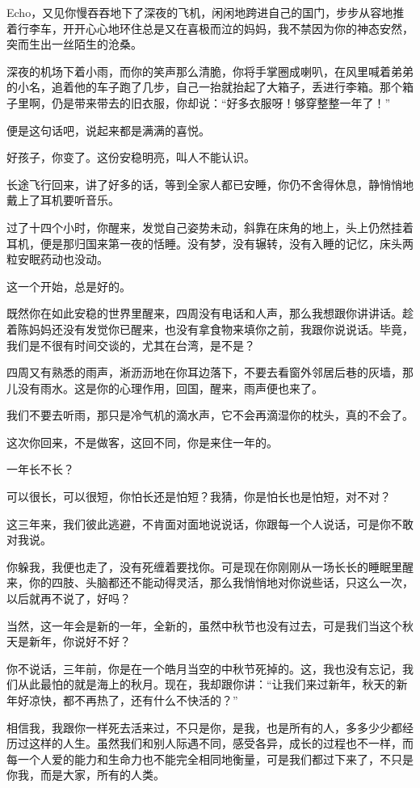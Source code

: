 \par Echo，又见你慢吞吞地下了深夜的飞机，闲闲地跨进自己的国门，步步从容地推着行李车，开开心心地环住总是又在喜极而泣的妈妈，我不禁因为你的神态安然，突而生出一丝陌生的沧桑。
\par 深夜的机场下着小雨，而你的笑声那么清脆，你将手掌圈成喇叭，在风里喊着弟弟的小名，追着他的车子跑了几步，自己一抬就抬起了大箱子，丢进行李箱。那个箱子里啊，仍是带来带去的旧衣服，你却说：“好多衣服呀！够穿整整一年了！”
\par 便是这句话吧，说起来都是满满的喜悦。
\par 好孩子，你变了。这份安稳明亮，叫人不能认识。
\par 长途飞行回来，讲了好多的话，等到全家人都已安睡，你仍不舍得休息，静悄悄地戴上了耳机要听音乐。
\par 过了十四个小时，你醒来，发觉自己姿势未动，斜靠在床角的地上，头上仍然挂着耳机，便是那归国来第一夜的恬睡。没有梦，没有辗转，没有入睡的记忆，床头两粒安眠药动也没动。
\par 这一个开始，总是好的。
\par 既然你在如此安稳的世界里醒来，四周没有电话和人声，那么我想跟你讲讲话。趁着陈妈妈还没有发觉你已醒来，也没有拿食物来填你之前，我跟你说说话。毕竟，我们是不很有时间交谈的，尤其在台湾，是不是？
\par 四周又有熟悉的雨声，淅沥沥地在你耳边落下，不要去看窗外邻居后巷的灰墙，那儿没有雨水。这是你的心理作用，回国，醒来，雨声便也来了。
\par 我们不要去听雨，那只是冷气机的滴水声，它不会再滴湿你的枕头，真的不会了。
\par 这次你回来，不是做客，这回不同，你是来住一年的。
\par 一年长不长？
\par 可以很长，可以很短，你怕长还是怕短？我猜，你是怕长也是怕短，对不对？
\par 这三年来，我们彼此逃避，不肯面对面地说说话，你跟每一个人说话，可是你不敢对我说。
\par 你躲我，我便也走了，没有死缠着要找你。可是现在你刚刚从一场长长的睡眠里醒来，你的四肢、头脑都还不能动得灵活，那么我悄悄地对你说些话，只这么一次，以后就再不说了，好吗？
\par 当然，这一年会是新的一年，全新的，虽然中秋节也没有过去，可是我们当这个秋天是新年，你说好不好？
\par 你不说话，三年前，你是在一个皓月当空的中秋节死掉的。这，我也没有忘记，我们从此最怕的就是海上的秋月。现在，我却跟你讲：“让我们来过新年，秋天的新年好凉快，都不再热了，还有什么不快活的？”
\par 相信我，我跟你一样死去活来过，不只是你，是我，也是所有的人，多多少少都经历过这样的人生。虽然我们和别人际遇不同，感受各异，成长的过程也不一样，而每一个人爱的能力和生命力也不能完全相同地衡量，可是我们都过下来了，不只是你我，而是大家，所有的人类。
